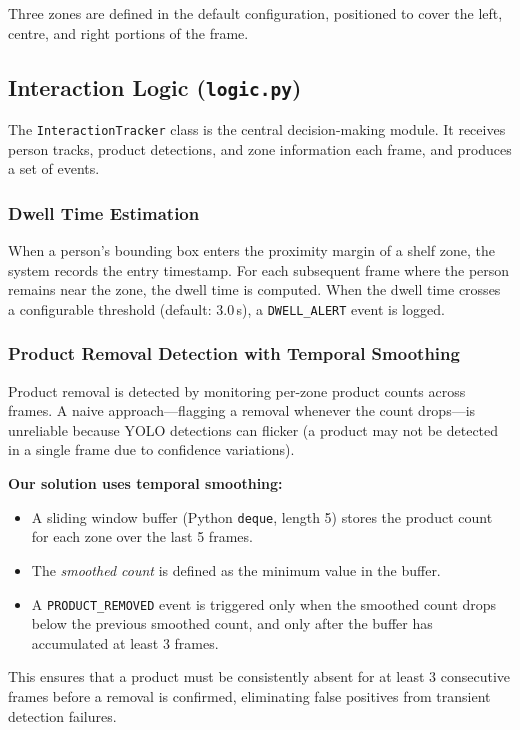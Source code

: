 \documentclass[12pt,a4paper]{article}
\begin{document}
Three zones are defined in the default configuration, positioned to cover the left, centre, and right portions of the frame.

\subsection{Interaction Logic (\texttt{logic.py})}

The \texttt{InteractionTracker} class is the central decision-making module.
It receives person tracks, product detections, and zone information each frame, and produces a set of events.

\subsubsection{Dwell Time Estimation}

When a person's bounding box enters the proximity margin of a shelf zone, the system records the entry timestamp.
For each subsequent frame where the person remains near the zone, the dwell time is computed.
When the dwell time crosses a configurable threshold (default: 3.0\,s), a \texttt{DWELL\_ALERT} event is logged.

\subsubsection{Product Removal Detection with Temporal Smoothing}

Product removal is detected by monitoring per-zone product counts across frames.
A naive approach—flagging a removal whenever the count drops—is unreliable because YOLO detections can flicker (a product may not be detected in a single frame due to confidence variations).

\textbf{Our solution uses temporal smoothing:}
\begin{itemize}[nosep]
    \item A sliding window buffer (Python \texttt{deque}, length 5) stores the product count for each zone over the last 5 frames.
    \item The \textit{smoothed count} is defined as the minimum value in the buffer.
    \item A \texttt{PRODUCT\_REMOVED} event is triggered only when the smoothed count drops below the previous smoothed count, and only after the buffer has accumulated at least 3 frames.
\end{itemize}

This ensures that a product must be consistently absent for at least 3 consecutive frames before a removal is confirmed, eliminating false positives from transient detection failures.
\end{document}
